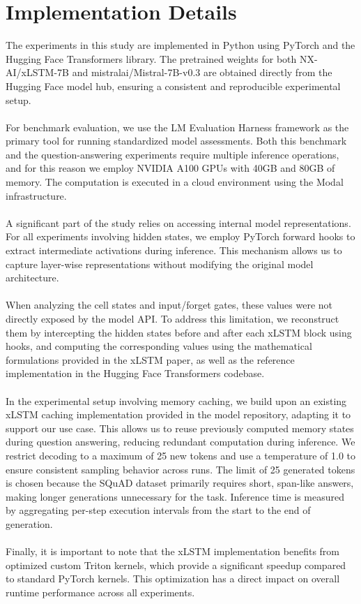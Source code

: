 \section{Implementation Details}
\label{ch:implementation}

The experiments in this study are implemented in Python using PyTorch and the Hugging Face Transformers library. 
The pretrained weights for both NX-AI/xLSTM-7B and mistralai/Mistral-7B-v0.3 are obtained directly from the Hugging
Face model hub, ensuring a consistent and reproducible experimental setup. \\ \\
%
For benchmark evaluation, we use the LM Evaluation Harness \cite{eval-harness} framework as the primary tool for running standardized model assessments. 
Both this benchmark and the question-answering experiments require multiple inference operations, and for this reason we employ 
NVIDIA A100 GPUs with 40GB and 80GB of memory. The computation is executed in a cloud environment using the Modal infrastructure.\\ \\
%
A significant part of the study relies on accessing internal model representations. For all experiments involving hidden states, 
we employ PyTorch forward hooks to extract intermediate activations during inference. 
This mechanism allows us to capture layer-wise representations without modifying the original model architecture.\\ \\
%
When analyzing the cell states and input/forget gates, these values were not directly 
exposed by the model API. To address this limitation, we reconstruct them by intercepting the hidden states 
before and after each xLSTM block using hooks, and computing the corresponding values using the mathematical 
formulations provided in the xLSTM paper, as well as the reference implementation in the Hugging Face Transformers codebase. \\ \\
%
In the experimental setup involving memory caching, we build upon an existing xLSTM caching implementation provided in the model repository, 
adapting it to support our use case. This allows us to reuse previously computed memory states during question answering,
reducing redundant computation during inference. We restrict decoding to a maximum of 25 new tokens and use a temperature of 1.0 
to ensure consistent sampling behavior across runs. The limit of 25 generated tokens is chosen because the SQuAD dataset 
primarily requires short, span-like answers, making longer generations unnecessary for the task. 
Inference time is measured by aggregating per-step execution intervals from the start to the end of generation. \\ \\ 
%
Finally, it is important to note that the xLSTM implementation benefits from optimized custom Triton kernels, 
which provide a significant speedup compared to standard PyTorch kernels. This optimization has a direct impact 
on overall runtime performance across all experiments.